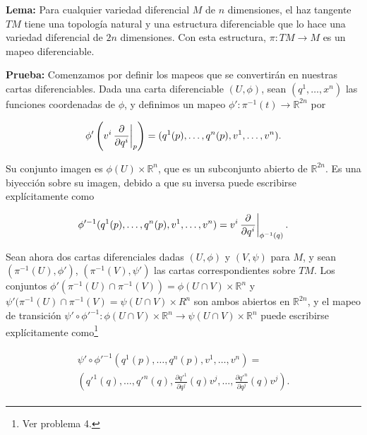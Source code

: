 \documentclass[a4paper,10pt]{article}
\numberwithin{equation}{section}
\newcommand{\zerodel}{.\kern-\nulldelimiterspace}
\newcommand{\lema}{\textbf{Lema: }}
\newcommand{\prueba}{\textbf{Prueba: }}
\begin{document}
\lema Para cualquier variedad diferencial $M$ de $n$ dimensiones, el haz tangente 
$TM$ tiene una topología natural y una estructura diferenciable que lo hace 
una variedad diferencial de $2n$ dimensiones. Con esta estructura, $\pi: TM \rightarrow M$ 
es un mapeo diferenciable.

\vspace{.3cm}

\prueba Comenzamos por definir los mapeos que se convertirán en nuestras cartas 
diferenciables. Dada una carta diferenciable $(U,\phi)$, sean $(q^1,\dots,x^n)$ 
las funciones coordenadas de $\phi$, y definimos un mapeo $\phi': \pi^{-1}(t) \rightarrow \mathbb{R}^{2n}$ 
por 

\begin{equation}
 \phi' \left( v^i \left\zerodel\frac{\partial}{\partial q^i}\right|_p \right) = 
 (q^1(p),\dots,q^n(p),v^1,\dots,v^n).
\end{equation}

Su conjunto imagen es $\phi(U) \times \mathbb{R}^n$, que es un subconjunto abierto 
de $\mathbb{R}^{2n}$. Es una biyección sobre su imagen, debido a que su inversa 
puede escribirse explícitamente como

\begin{equation}
 \phi'^{-1}(q^1(p),\dots,q^n(p),v^1,\dots,v^n) = v^i \left\zerodel\frac{\partial}{\partial q^i}\right|_{\phi^{-1}(q)}.
\end{equation}

Sean ahora dos cartas diferenciales dadas $(U,\phi)$ y $(V,\psi)$ para $M$, y 
sean $(\pi^{-1}(U),\phi')$, $(\pi^{-1}(V),\psi')$ las cartas correspondientes sobre 
$TM$. Los conjuntos $\phi'(\pi^{-1}(U)\cap\pi^{-1}(V)) = \phi(U \cap V) \times \mathbb{R}^n$ 
y $\psi'(\pi^{-1}(U)\cap\pi^{-1}(V) = \psi(U \cap V) \times R^n$ son ambos abiertos 
en $\mathbb{R}^{2n}$, y el mapeo de transición 
$\psi' \circ \phi'^{-1}: \phi(U \cap V) \times \mathbb{R}^n \rightarrow 
\psi(U\cap V)\times \mathbb{R}^n$ puede escribirse explícitamente como\footnote{Ver problema 4.}

\begin{align}
\begin{split}
 \psi' \circ \phi'^{-1}(q^1(p),\dots,q^n(p),v^1,\dots,v^n) = \\
 \left(q'^1(q),\dots,q'^n(q),\frac{\partial q'^1}{\partial q^j}(q)v^j, 
 \dots,\frac{\partial q'^n}{\partial q^j}(q)v^j\right).
 \end{split}
\end{align}
\end{document}
